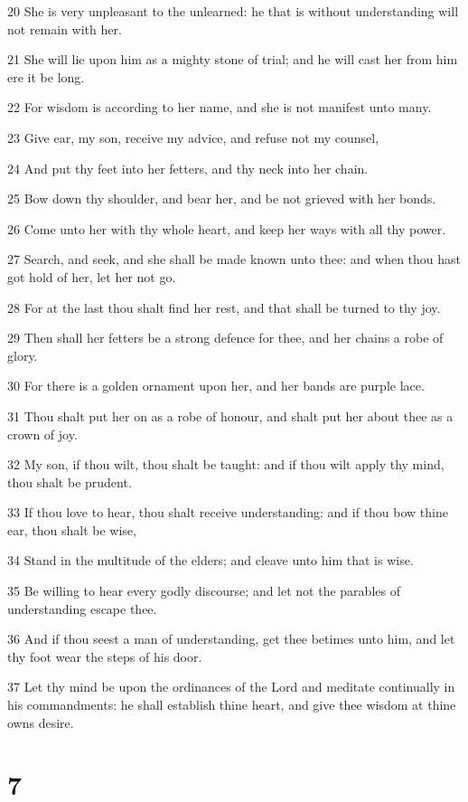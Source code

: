 \par 20 She is very unpleasant to the unlearned: he that is without understanding will not remain with her.
\par 21 She will lie upon him as a mighty stone of trial; and he will cast her from him ere it be long.
\par 22 For wisdom is according to her name, and she is not manifest unto many.
\par 23 Give ear, my son, receive my advice, and refuse not my counsel,
\par 24 And put thy feet into her fetters, and thy neck into her chain.
\par 25 Bow down thy shoulder, and bear her, and be not grieved with her bonds.
\par 26 Come unto her with thy whole heart, and keep her ways with all thy power.
\par 27 Search, and seek, and she shall be made known unto thee: and when thou hast got hold of her, let her not go.
\par 28 For at the last thou shalt find her rest, and that shall be turned to thy joy.
\par 29 Then shall her fetters be a strong defence for thee, and her chains a robe of glory.
\par 30 For there is a golden ornament upon her, and her bands are purple lace.
\par 31 Thou shalt put her on as a robe of honour, and shalt put her about thee as a crown of joy.
\par 32 My son, if thou wilt, thou shalt be taught: and if thou wilt apply thy mind, thou shalt be prudent.
\par 33 If thou love to hear, thou shalt receive understanding: and if thou bow thine ear, thou shalt be wise,
\par 34 Stand in the multitude of the elders; and cleave unto him that is wise.
\par 35 Be willing to hear every godly discourse; and let not the parables of understanding escape thee.
\par 36 And if thou seest a man of understanding, get thee betimes unto him, and let thy foot wear the steps of his door.
\par 37 Let thy mind be upon the ordinances of the Lord and meditate continually in his commandments: he shall establish thine heart, and give thee wisdom at thine owns desire.

\chapter{7}

